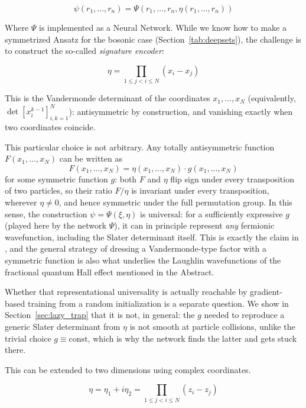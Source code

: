 \documentclass[a4paper,11pt,twoside]{article}
\begin{document}
\begin{equation}
\psi(r_1 ,..., r_n) = \Psi( r_1, ...,r_n,  \eta(r_1 ,..., r_n  ))
\end{equation}


Where $\Psi$ is implemented as a Neural Network. While we know how to make a symmetrized Ansatz for the bosonic case (Section~\ref{tab:deepsets}), the challenge is to construct the so-called \textit{signature encoder}:

\begin{equation}
    \eta = \prod_{1 \le j < i \le N} (x_i - x_j)
\end{equation}

This is the Vandermonde determinant of the coordinates $x_1,...,x_N$ (equivalently, $\det[x_i^{k-1}]_{i,k=1}^N$): antisymmetric by construction, and vanishing exactly when two coordinates coincide.

This particular choice is not arbitrary. Any totally antisymmetric function $F(x_1,...,x_N)$ can be written as
\begin{equation}
    F(x_1,...,x_N) = \eta(x_1,...,x_N) \cdot g(x_1,...,x_N)
\end{equation}
for some symmetric function $g$: both $F$ and $\eta$ flip sign under every transposition of two particles, so their ratio $F/\eta$ is invariant under every transposition, wherever $\eta \neq 0$, and hence symmetric under the full permutation group. 
In this sense, the construction $\psi = \Psi(\xi, \eta)$ is universal: for a sufficiently expressive $g$ (played here by the network $\Psi$), it can in principle represent \emph{any} fermionic wavefunction, including the Slater determinant itself. This is exactly the claim in \cite{fu_minimal_2025}, and the general strategy of dressing a Vandermonde-type factor with a symmetric function is also what underlies the Laughlin wavefunctions of the fractional quantum Hall effect mentioned in the Abstract.

Whether that representational universality is actually reachable by gradient-based training from a random initialization is a separate question. We show in Section~\ref{sec:lazy_trap} that it is not, in general: the $g$ needed to reproduce a generic Slater determinant from $\eta$ is not smooth at particle collisions, unlike the trivial choice $g \equiv \text{const}$, which is why the network finds the latter and gets stuck there.

This can be extended to two dimensions using complex coordinates.

\begin{equation}
    \eta = \eta_1 + i \eta_2 = \prod_{1 \le j < i \le N} (z_i - z_j)
\end{equation}
\end{document}

